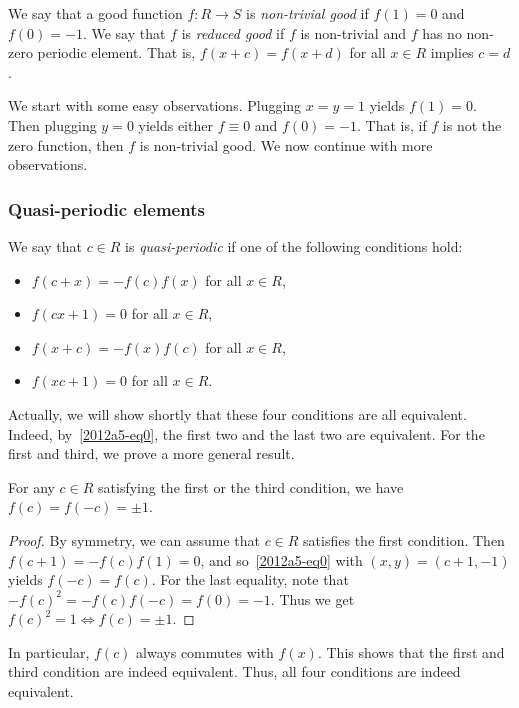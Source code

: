 We say that a good function $f : R \to S$ is \emph{non-trivial good} if $f(1) = 0$ and $f(0) = -1$.
We say that $f$ is \emph{reduced good} if $f$ is non-trivial and $f$ has no non-zero periodic element.
That is, $f(x + c) = f(x + d)$ for all $x \in R$ implies $c = d$.

We start with some easy observations.
Plugging $x = y = 1$ yields $f(1) = 0$.
Then plugging $y = 0$ yields either $f \equiv 0$ and $f(0) = -1$.
That is, if $f$ is not the zero function, then $f$ is non-trivial good.
We now continue with more observations.




\subsubsection*{Quasi-periodic elements}

We say that $c \in R$ is \emph{quasi-periodic} if one of the following conditions hold:
\begin{itemize}
    \item   $f(c + x) = -f(c) f(x)$ for all $x \in R$,
    \item   $f(cx + 1) = 0$ for all $x \in R$,
    \item   $f(x + c) = -f(x) f(c)$ for all $x \in R$,
    \item   $f(xc + 1) = 0$ for all $x \in R$.
\end{itemize}

Actually, we will show shortly that these four conditions are all equivalent.
Indeed, by~\eqref{2012a5-eq0}, the first two and the last two are equivalent.
For the first and third, we prove a more general result.

\begin{claim}
For any $c \in R$ satisfying the first or the third condition, we have $f(c) = f(-c) = \pm 1$.
\end{claim}
\begin{proof}
By symmetry, we can assume that $c \in R$ satisfies the first condition.
Then $f(c + 1) = -f(c) f(1) = 0$, and so~\eqref{2012a5-eq0} with $(x, y) = (c + 1, -1)$ yields $f(-c) = f(c)$.
For the last equality, note that $-f(c)^2 = -f(c) f(-c) = f(0) = -1$.
Thus we get $f(c)^2 = 1 \iff f(c) = \pm 1$.
\end{proof}

In particular, $f(c)$ always commutes with $f(x)$.
This shows that the first and third condition are indeed equivalent.
Thus, all four conditions are indeed equivalent.

